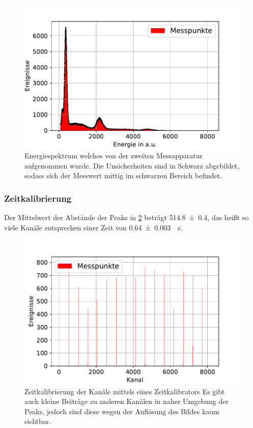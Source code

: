 \documentclass[
	a4paper,
	12pt,
	pagesize,
	ngerman
]{scrartcl}
\begin{document}
	\begin{figure}[H]
				\includegraphics[width= 0.9 \linewidth]{img/Energiespektrum_Stop}
				\caption{
				Energiespektrum welches von der zweiten Messapparatur aufgenommen wurde.
				Die Unsicherheiten sind in Schwarz abgebildet, sodass sich der Messwert mittig im schwarzen Bereich befindet.
				}
				\label{fig_energy_stop}
		\end{figure}

  \subsubsection{Zeitkalibrierung}
	Der Mittelwert der Abstände der Peaks in \cref{fig_zeitkalibrierung} beträgt \SI{514.8+-0.4}{}, das heißt so viele Kanäle entsprechen einer Zeit von \SI{0.64+-0.003}{\mu s}.

	\begin{figure}[H]
				\includegraphics[width= 0.9 \linewidth]{img/Zeitkalibrierung}
				\caption{
				Zeitkalibrierung der Kanäle mittels eines Zeitkalibrators %
				Es gibt auch kleine Beiträge zu anderen Kanälen in naher Umgebung der Peaks, jedoch sind diese wegen der Auflösung des Bildes kaum sichtbar.
				}
				\label{fig_zeitkalibrierung}
		\end{figure}
\end{document}
